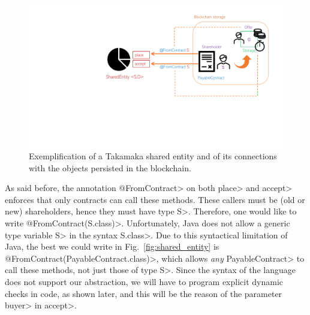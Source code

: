 \begin{figure}[ht]
\centering
\includegraphics[width=.9\linewidth]{figures/shared_entity}
\caption{Exemplification of a Takamaka shared entity and of its connections with the objects persisted in the blockchain.}
\label{figure.shared_entity}
\end{figure}

As said before, the annotation \<@FromContract> on both \<place> and \<accept> enforces that only
contracts can call these methods.
These callers must be (old or new) shareholders,
hence they must have type \<S>. Therefore, one would like to write
\<@FromContract(S.class)>. Unfortunately, Java does not allow a generic type variable \<S>
in the syntax \<S.class>. Due to this syntactical limitation of Java,
the best we could write in Fig.~\ref{fig:shared_entity} is \<@FromContract(PayableContract.class)>,
which allows \emph{any} \<PayableContract> to call these methods, not just those of type \<S>.
Since the syntax of the language does not support our abstraction, we will have to
program explicit dynamic checks in code, as shown later, and this will be the reason of the
parameter \<buyer> in \<accept>.

